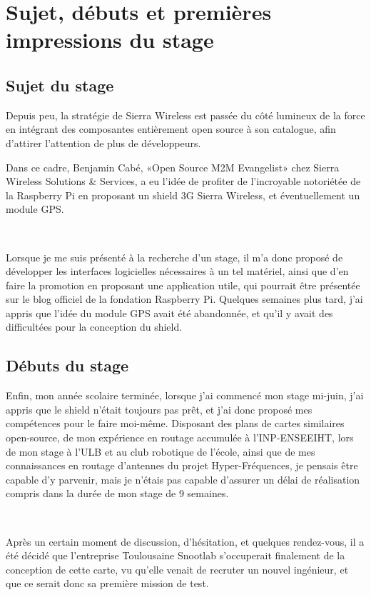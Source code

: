\documentclass{article}
\begin{document}
\clearpage

\section{Sujet, débuts et premières impressions du stage}
\subsection{Sujet du stage}

Depuis peu, la stratégie de Sierra Wireless est passée du côté lumineux de la force en intégrant des composantes entièrement open source à son catalogue, afin d’attirer l’attention de plus de développeurs.

Dans ce cadre, Benjamin Cabé, «Open Source M2M Evangelist» chez Sierra Wireless Solutions \& Services, a eu l’idée de profiter de l’incroyable notoriétée de la Raspberry Pi en proposant un shield 3G Sierra Wireless, et éventuellement un module GPS.

~

Lorsque je me suis présenté à la recherche d’un stage, il m’a donc proposé de développer les interfaces logicielles nécessaires à un tel matériel, ainsi que d’en faire la promotion en proposant une application utile, qui pourrait être présentée sur le blog officiel de la fondation Raspberry Pi. Quelques semaines plus tard, j’ai appris que l’idée du module GPS avait été abandonnée, et qu’il y avait des difficultées pour la conception du shield.

\subsection{Débuts du stage}

Enfin, mon année scolaire terminée, lorsque j’ai commencé mon stage mi-juin, j’ai appris que le shield n’était toujours pas prêt, et j’ai donc proposé mes compétences pour le faire moi-même. Disposant des plans de cartes similaires open-source, de mon expérience en routage accumulée à l’INP-ENSEEIHT, lors de mon stage à l’ULB et au club robotique de l’école, ainsi que de mes connaissances en routage d’antennes du projet Hyper-Fréquences, je pensais être capable d’y parvenir, mais je n’étais pas capable d’assurer un délai de réalisation compris dans la durée de mon stage de 9 semaines.

~

Après un certain moment de discussion, d’hésitation, et quelques rendez-vous, il a été décidé que l’entreprise Toulousaine Snootlab s’occuperait finalement de la conception de cette carte, vu qu’elle venait de recruter un nouvel ingénieur, et que ce serait donc sa première mission de test.
\end{document}

